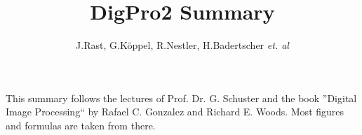 \documentclass{scrartcl}
\title{DigPro2 Summary}
\author{J.Rast, G.Köppel, R.Nestler, H.Badertscher \textit{et. al}}
\begin{document}

\lstset{language=Matlab}

\begin{titlepage}
	\maketitle
	\vfill
	\hspace{2cm}
	\begin{minipage}{0.6\linewidth}
		This summary follows the lectures of Prof. Dr. G. Schuster and the book
		''Digital Image Processing`` by Rafael C. Gonzalez and Richard E. Woods. Most
		figures and formulas are taken from there.
	\end{minipage}
\end{titlepage}

\setcounter{tocdepth}{2}
\tableofcontents
\newpage

\setcounter{section}{8}




%
\end{document}
